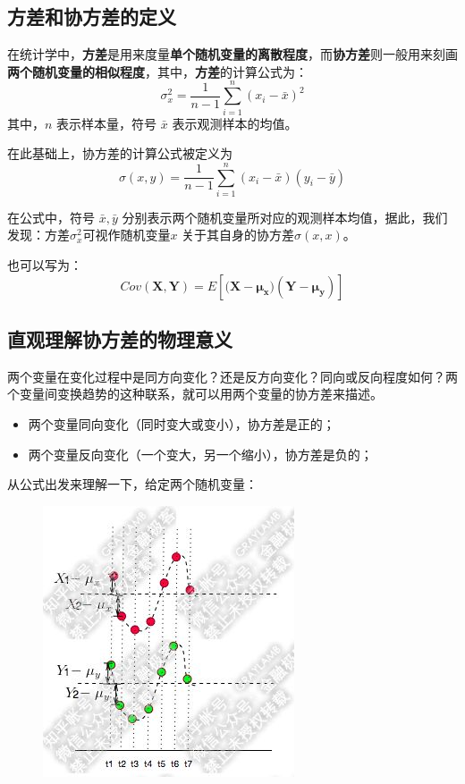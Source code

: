 \documentclass[12pt]{article}
\begin{document}
\subsection{方差和协方差的定义}

\begin{mdframed}[
linecolor=black!40,
outerlinewidth=1pt,
roundcorner=.5em,
innertopmargin=1ex,
innerbottommargin=.5\baselineskip,
innerrightmargin=1em,
innerleftmargin=1em,
backgroundcolor=gray!5,
]
在统计学中，\textbf{方差}是用来度量\textbf{单个随机变量的离散程度}，而\textbf{协方差}则一般用来刻画\textbf{两个随机变量的相似程度}，其中，\textbf{方差}的计算公式为：
$$
\sigma_x^2 = \frac{1}{n-1}\sum_{i=1}^n(x_i - \bar{x})^2
$$
其中，$n$ 表示样本量，符号 $\bar{x}$ 表示观测样本的均值。
\end{mdframed}

在此基础上，协方差的计算公式被定义为
$$
\sigma(x,y) = \frac{1}{n-1}\sum_{i=1}^n(x_i - \bar{x})(y_i - \bar{y})
$$

在公式中，符号 $\bar{x},\bar{y}$ 分别表示两个随机变量所对应的观测样本均值，据此，我们发现：方差$\sigma_x^2$可视作随机变量$x$ 关于其自身的协方差$\sigma(x,x)$。

也可以写为：
$$
Cov(\mathbf{X},\mathbf{Y}) = E[(\mathbf{X - \mu_x)(\mathbf{Y} - \mu_y)}]
$$

\subsection{直观理解协方差的物理意义}
两个变量在变化过程中是同方向变化？还是反方向变化？同向或反向程度如何？两个变量间变换趋势的这种联系，就可以用两个变量的协方差来描述。
\begin{itemize}
\setlength{\itemsep}{0pt}
\setlength{\parsep}{0pt}
\setlength{\parskip}{0pt}
    \item 两个变量同向变化（同时变大或变小），协方差是正的；
    \item 两个变量反向变化（一个变大，另一个缩小），协方差是负的；
\end{itemize}

从公式出发来理解一下，给定两个随机变量：
\begin{figure}[H]
    \centering
    \includegraphics[width=.5\textwidth]{fig/UnderstandCovarianceMatrix_1.jpg}
\end{figure} 
\end{document}
